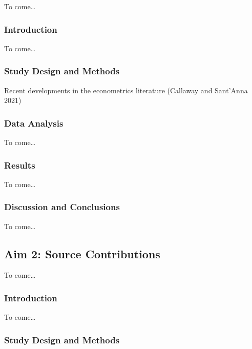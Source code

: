 \documentclass[
  letterpaper,
  DIV=11,
  numbers=noendperiod]{scrartcl}
\begin{document}
To come\ldots{}

\subsubsection{Introduction}\label{introduction-1}

To come\ldots{}

\subsubsection{Study Design and Methods}\label{study-design-and-methods}

Recent developments in the econometrics literature (Callaway and
Sant'Anna 2021)

\subsubsection{Data Analysis}\label{data-analysis}

To come\ldots{}

\subsubsection{Results}\label{results}

To come\ldots{}

\subsubsection{Discussion and
Conclusions}\label{discussion-and-conclusions}

To come\ldots{}

\subsection{Aim 2: Source
Contributions}\label{aim-2-source-contributions}

To come\ldots{}

\subsubsection{Introduction}\label{introduction-2}

To come\ldots{}

\subsubsection{Study Design and
Methods}\label{study-design-and-methods-1}
\end{document}
